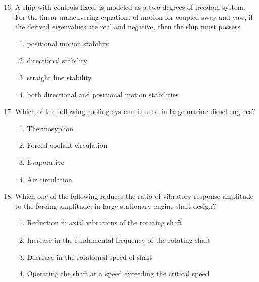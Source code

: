 \documentclass[journal]{IEEEtran}
\theoremstyle{remark}
\begin{document}
\newpage
\vspace*{0.25cm}

\begin{enumerate}[itemsep=1em]
\setcounter{enumi}{15}
\item A ship with controls fixed, is modeled as a two degrees of freedom system. For the linear maneuvering equations of motion for coupled sway and yaw, if the derived eigenvalues are real and negative, then the ship must possess 
\begin{enumerate}[leftmargin=2.5em, labelsep=0.5em, itemsep=0.5em]
      \item positional motion stability
      \item directional stability
      \item straight line stability
      \item both directional and positional motion stabilities
\end{enumerate}

\end{enumerate}

\begin{enumerate}[itemsep=1em]
\setcounter{enumi}{16}
\item Which of the following cooling systems is used in large marine diesel engines?
\begin{enumerate}[ leftmargin=2.5em, labelsep=0.5em, itemsep=0.5em]
      \item Thermosyphon
      \item Forced coolant circulation
      \item Evaporative
      \item Air circulation
\end{enumerate}
\end{enumerate}

\begin{enumerate}[itemsep=1em]
\setcounter{enumi}{17}
\item Which one of the following reduces the ratio of vibratory response amplitude to the forcing amplitude, in large stationary engine shaft design?
\begin{enumerate}[leftmargin=2.5em, labelsep=0.5em, itemsep=0.5em]
      \item Reduction in axial vibrations of the rotating shaft 
      \item Increase in the fundamental frequency of the rotating shaft
      \item Decrease in the rotational speed of shaft  
      \item Operating the shaft at a speed exceeding the critical speed  
\end{enumerate}
\end{enumerate}
\end{document}
